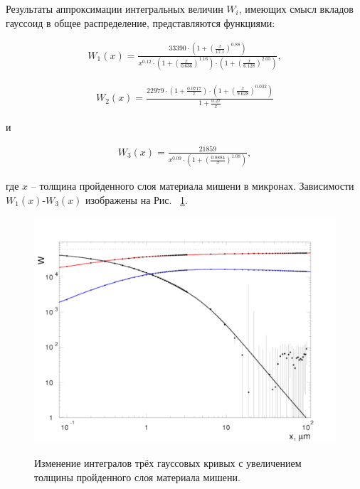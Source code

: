 \documentclass[a4paper,12pt]{article}
\begin{document}
\begin{large}
  Результаты аппроксимации интегральных величин $W_i$, имеющих смысл вкладов гауссоид в общее распределение, представляются функциями:
  
\begin{equation}
\label{MSApproximationW1}
\begin{aligned} 
W_1(x)= \frac{33390\cdot (1+\left(\frac{x}{17.1}\right)^{0.88})}{x^{0.12} \cdot \left(1+\left(\frac{x}{0.636}\right)^{1.16}\right) \cdot \left(1+\left(\frac{x}{6.128}\right)^{2.05}\right)},
\end{aligned}
\end{equation}

\begin{equation}
\label{MSApproximationW2}
\begin{aligned} 
W_2(x)= \frac{22979\cdot \left(1+\frac{0.0717}{x}\right)\cdot \left(1+\left(\frac{x}{9.628}\right)^{0.032}\right)}{1+\frac{0.27}{x}}
\end{aligned}
\end{equation}

и

\begin{equation}
\label{MSApproximationW3}
\begin{aligned} 
W_3(x)= \frac{21859}{x^{0.09}\cdot\left(1+\left(\frac{0.8884}{x}\right)^{1.08}\right)},
\end{aligned}
\end{equation}

где $x$ -- толщина пройденного слоя материала мишени в микронах. Зависимости $W_1(x)$-$W_3(x)$ изображены на Рис. ~\ref{fig:Par1theta}.

\begin{figure}[ht]
  {
     \includegraphics[width=0.99\linewidth]{images/pars135}
  }
  \caption{Изменение интегралов трёх гауссовых кривых с увеличением толщины пройденного слоя материала мишени.}
  \label{fig:Par1theta}
\end{figure}


\end{large}
\end{document}
